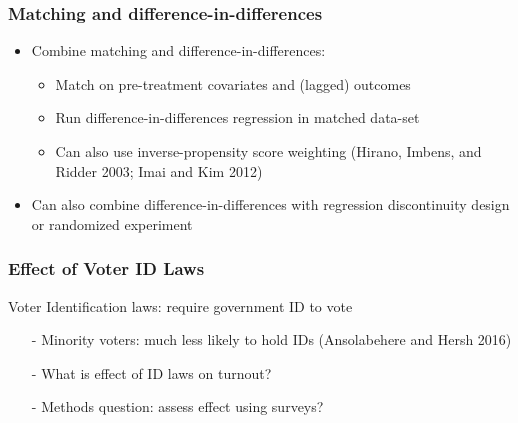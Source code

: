 \documentclass{beamer}
\numberwithin{equation}{section}
\begin{document}
\begin{frame}
  \frametitle{Matching and difference-in-differences}

\begin{itemize}
\item Combine matching and difference-in-differences:\medskip
\begin{itemize}
  \item Match on pre-treatment covariates and (lagged) outcomes\medskip
  \item Run difference-in-differences regression in matched data-set\medskip
  \item Can also use inverse-propensity score weighting (Hirano, Imbens, and Ridder 2003; Imai and Kim 2012)\medskip
\end{itemize}\bigskip
\item Can also combine difference-in-differences with regression discontinuity design or randomized experiment \bigskip
\end{itemize}
\end{frame}


\begin{frame}
\frametitle{Effect of Voter ID Laws}

Voter Identification laws: require government ID to vote

\begin{itemize}
  \item[-] Minority voters: much less likely to hold IDs (Ansolabehere and Hersh 2016)
  \item[-] What is effect of ID laws on turnout?
  \item[-] Methods question: assess effect using surveys?
\end{itemize}

\end{frame}
\end{document}
